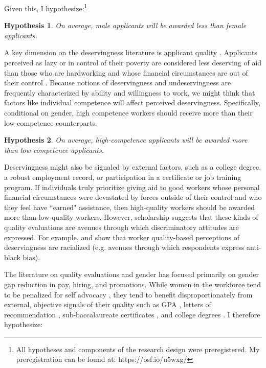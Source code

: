 \documentclass[12pt]{article}%
\newtheorem{hypothesis}{Hypothesis}
\begin{document}
\begin{doublespace}
Given this, I hypothesize:\footnote{All hypotheses and components of the research design were preregistered. My preregistration can be found at: https://osf.io/u5wxg/}

\begin{hypothesis} \label{hyp:first}
	On average, male applicants will be awarded less than female applicants.
\end{hypothesis}

A key dimension on the deservingness literature is applicant quality \citep{petersen2012deserves, petersen2012social}. Applicants perceived as lazy or in control of their poverty are considered less deserving of aid than those who are hardworking and whose financial circumstances are out of their control \citep{aaroe2014crowding}. Because notions of deservingness and undeservingness are frequently characterized by ability and willingness to work, we might think that factors like individual competence will affect perceived deservingness. Specifically, conditional on gender, high competence workers should receive more than their low-competence counterparts.


\begin{hypothesis} \label{hyp:second}
	On average, high-competence applicants will be awarded more than low-competence applicants.
\end{hypothesis}


Deservingness might also be signaled by external factors, such as a college degree, a robust employment record, or participation in a certificate or job training program. If individuals truly prioritize giving aid to good workers whose personal financial circumstances were devastated by forces outside of their control and who they feel have ``earned" assistance, then high-quality workers should be awarded more than low-quality workers. However, scholarship suggests that these kinds of quality evaluations are avenues through which discriminatory attitudes are expressed. For example, \cite{gilens_why_2000} and \cite{desante_working_2013} show that worker quality-based perceptions of deservingness are racialized (e.g. avenues through which respondents express anti-black bias).

The literature on quality evaluations and gender has focused primarily on gender gap reduction in pay, hiring, and promotions. While women in the workforce tend to be penalized for self advocacy \citep{quadlin_market, exley2020knowing}, they tend to benefit disproportionately from external, objective signals of their quality such as GPA \citep{quadlin2018mark}, letters of recommendation \citep{abel_value_2020}, sub-baccalaureate certificates  \citep{dadgar_labor_2015}, and college degrees \citep{jepsen_labor-market_2014}. I therefore hypothesize:



\end{doublespace}
\end{document}
